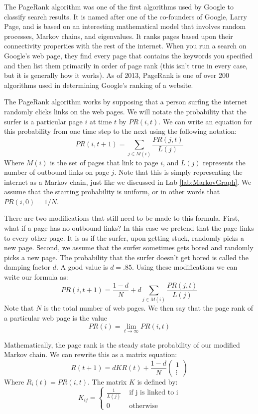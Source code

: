 \label{lab:PageRank}

The PageRank algorithm was one of the first algorithms used by Google to classify search results.
It is named after one of the co-founders of Google, Larry Page, and is based on an interesting mathematical model that involves random processes, Markov chains, and eigenvalues.
It ranks pages based upon their connectivity properties with the rest of the internet.
When you run a search on Google's web page, they find every page that contains the keywords you specified and then list them primarily in order of page rank (this isn't true in every case, but it is generally how it works).
As of 2013, PageRank is one of over 200 algorithms used in determining Google's ranking of a website.

The PageRank algorithm works by supposing that a person surfing the internet randomly clicks links on the web pages.
We will notate the probability that the surfer is a particular page $i$ at time $t$ by $PR(i,t)$.
We can write an equation for this probability from one time step to the next using the following notation:
\[PR(i,t+1) = \sum_{j \in M(i)} \frac{PR(j,t)}{L(j)}\]
Where $M(i)$ is the set of pages that link to page $i$, and $L(j)$ represents the number of outbound links on page $j$.
Note that this is simply representing the internet as a Markov chain, just like we discussed in Lab \ref{lab:MarkovGraph}.
We assume that the starting probability is uniform, or in other words that $PR(i,0) = 1/N$.

There are two modifications that still need to be made to this formula.
First, what if a page has no outbound links?
In this case we pretend that the page links to every other page.
It is as if the surfer, upon getting stuck, randomly picks a new page.
Second, we assume that the surfer sometimes gets bored and randomly picks a new page.
The probability that the surfer doesn't get bored is called the damping factor $d$.
A good value is $d=.85$.
Using these modifications we can write our formula as:
\[PR(i,t+1) = \frac{1-d}{N} + d\sum_{j \in M(i)} \frac{PR(j,t)}{L(j)}\]
Note that $N$ is the total number of web pages.
We then say that the page rank of a particular web page is the value
\[PR(i) = \lim_{t\to \infty} PR(i,t)\]

Mathematically, the page rank is the steady state probability of our modified Markov chain.
We can rewrite this as a matrix equation:
\[R(t+1) = d K R(t) + \frac{1-d}{N} \begin{pmatrix}1\\\vdots\end{pmatrix}\]
Where $R_i(t) = PR(i,t)$.
The matrix $K$ is defined by:
\[K_{ij} = \begin{cases} \frac{1}{L(j)} & \mbox{ if j is linked to i} \\
	0 & \mbox{ otherwise} \end{cases}\]


